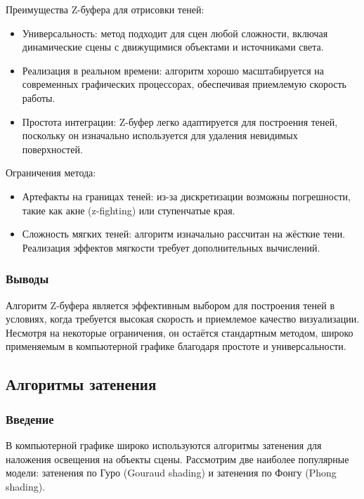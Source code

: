 Преимущества Z-буфера для отрисовки теней:

\begin{itemize}
    \item Универсальность: метод подходит для сцен любой сложности, включая динамические сцены с движущимися объектами и источниками света.
    \item Реализация в реальном времени: алгоритм хорошо масштабируется на современных графических процессорах, обеспечивая приемлемую скорость работы.
    \item Простота интеграции: Z-буфер легко адаптируется для построения теней, поскольку он изначально используется для удаления невидимых поверхностей.
\end{itemize}

Ограничения метода:

\begin{itemize}
    \item Артефакты на границах теней: из-за дискретизации возможны погрешности, такие как акне (z-fighting) или ступенчатые края.
    \item Сложность мягких теней: алгоритм изначально рассчитан на жёсткие тени. Реализация эффектов мягкости требует дополнительных вычислений.
\end{itemize}


\subsubsection{Выводы}

\hspace{1.25cm}
Алгоритм Z-буфера является эффективным выбором для построения теней в условиях, когда требуется высокая скорость и приемлемое качество визуализации. Несмотря на некоторые ограничения, он остаётся стандартным методом, широко применяемым в компьютерной графике благодаря простоте и универсальности.~\cite{romanyuk_kurinnyy}




\subsection{Алгоритмы затенения}

\subsubsection{Введение}

\hspace{1.25cm}
В компьютерной графике широко используются алгоритмы затенения для наложения освещения на объекты сцены. Рассмотрим две наиболее популярные модели: затенения по Гуро (Gouraud shading) и затенения по Фонгу (Phong shading).

